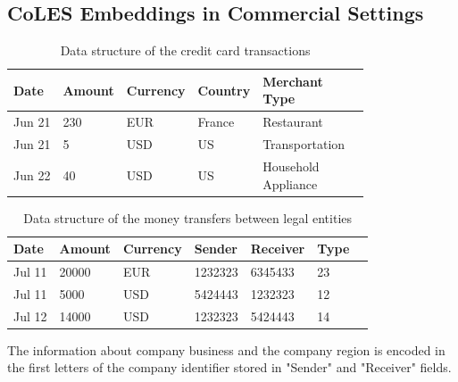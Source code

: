 \documentclass[sigconf, anonymous]{acmart}
\begin{document}
\subsection{CoLES Embeddings in Commercial Settings} \label{sec-commercial}

\begin{table}
\centering
\caption{Data structure of the credit card transactions}
\begin{tabular}{llllll}
\toprule
\textbf{Date} & \textbf{Amount} & \textbf{Currency} & \textbf{Country} & \makecell{\textbf{Merchant} \\ \textbf{Type}} \\
\midrule
Jun 21 & 230 & EUR & France & Restaurant \\
Jun 21 & 5 & USD & US & Transportation \\
Jun 22 & 40 & USD & US & \makecell[l]{Household \\ Appliance} \\
\bottomrule
\end{tabular}
\label{tab-tr-data}
\end{table}


\begin{table}
\centering
\caption{Data structure of the money transfers between legal entities}
\begin{tabular}{lllllll}
\toprule
\textbf{Date} & \textbf{Amount} & \textbf{Currency} & \textbf{Sender} & \textbf{Receiver} & \textbf{Type} \\
\midrule
Jul 11 & 20000 & EUR & 1232323 & 6345433 & 23 \\
Jul 11 & 5000 & USD & 5424443 & 1232323 & 12 \\
Jul 12 & 14000 & USD & 1232323 & 5424443 & 14 \\
\bottomrule
\end{tabular}
\small{The information about company business and the company region is encoded in the first letters of the company identifier stored in "Sender" and "Receiver" fields.}
\label{tab-org-tr-data}
\end{table}
\end{document}
